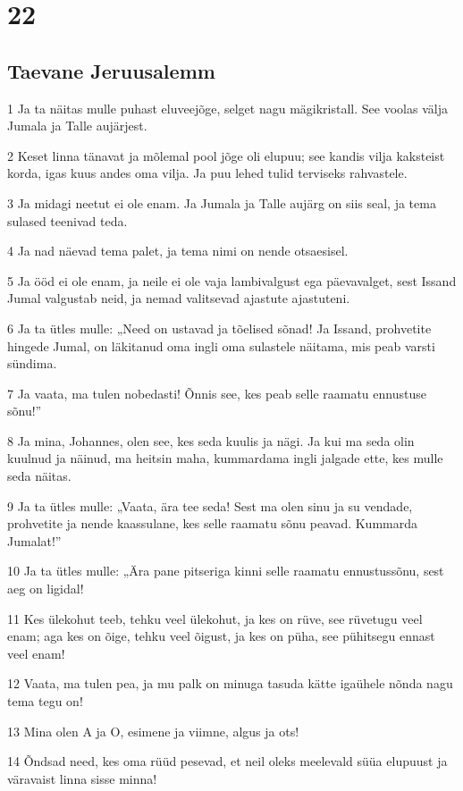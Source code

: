 \chapter{22}

\section*{Taevane Jeruusalemm}

\par 1 Ja ta näitas mulle puhast eluveejõge, selget nagu mägikristall. See voolas välja Jumala ja Talle aujärjest.
\par 2 Keset linna tänavat ja mõlemal pool jõge oli elupuu; see kandis vilja kaksteist korda, igas kuus andes oma vilja. Ja puu lehed tulid terviseks rahvastele.
\par 3 Ja midagi neetut ei ole enam. Ja Jumala ja Talle aujärg on siis seal, ja tema sulased teenivad teda.
\par 4 Ja nad näevad tema palet, ja tema nimi on nende otsaesisel.
\par 5 Ja ööd ei ole enam, ja neile ei ole vaja lambivalgust ega päevavalget, sest Issand Jumal valgustab neid, ja nemad valitsevad ajastute ajastuteni.
\par 6 Ja ta ütles mulle: „Need on ustavad ja tõelised sõnad! Ja Issand, prohvetite hingede Jumal, on läkitanud oma ingli oma sulastele näitama, mis peab varsti sündima.
\par 7 Ja vaata, ma tulen nobedasti! Õnnis see, kes peab selle raamatu ennustuse sõnu!”
\par 8 Ja mina, Johannes, olen see, kes seda kuulis ja nägi. Ja kui ma seda olin kuulnud ja näinud, ma heitsin maha, kummardama ingli jalgade ette, kes mulle seda näitas.
\par 9 Ja ta ütles mulle: „Vaata, ära tee seda! Sest ma olen sinu ja su vendade, prohvetite ja nende kaassulane, kes selle raamatu sõnu peavad. Kummarda Jumalat!”
\par 10 Ja ta ütles mulle: „Ära pane pitseriga kinni selle raamatu ennustussõnu, sest aeg on ligidal!
\par 11 Kes ülekohut teeb, tehku veel ülekohut, ja kes on rüve, see rüvetugu veel enam; aga kes on õige, tehku veel õigust, ja kes on püha, see pühitsegu ennast veel enam!
\par 12 Vaata, ma tulen pea, ja mu palk on minuga tasuda kätte igaühele nõnda nagu tema tegu on!
\par 13 Mina olen A ja O, esimene ja viimne, algus ja ots!
\par 14 Õndsad need, kes oma rüüd pesevad, et neil oleks meelevald süüa elupuust ja väravaist linna sisse minna!
